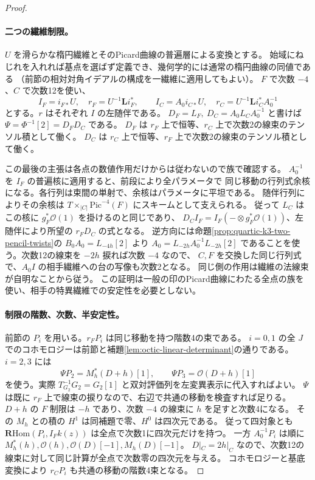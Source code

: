 \begin{proof}
\paragraph{二つの繊維制限。}
$U$ を滑らかな楕円繊維とそのPicard曲線の普遍層による変換とする。
始域にねじれを入れれば基点を選ばず定義でき、幾何学的には通常の楕円曲線の同値である
（前節の相対対角イデアルの構成を一繊維に適用してもよい）。
$F$ で次数 $-4$、$C$ で次数12を使い、
\[
 I_F=i_{F*}U,\quad r_F=U^{-1}\mathbf L i_F^*,\qquad
 I_C=A_0 i_{C*}U,\quad r_C=U^{-1}\mathbf L i_C^* A_0^{-1}
\]
とする。$r$ はそれぞれ $I$ の左随伴である。
$D_F=L_F,\ D_C=A_0 L_C A_0^{-1}$ と書けば $\Psi=\Phi^{-1}[2]=D_F D_C$ である。
$D_F$ は $r_F$ 上で恒等、$r_C$ 上で次数2の線束のテンソル積として働く。
$D_C$ は $r_C$ 上で恒等、$r_F$ 上で次数2の線束のテンソル積として働く。

この最後の主張は各点の数値作用だけからは従わないので族で確認する。
$A_0^{-1}$ を $I_F$ の普遍核に適用すると、前段により全パラメータで
同じ移動の行列式余核になる。各行列は束間の単射で、余核はパラメータに平坦である。
随伴行列によりその余核は $T\times_{|C|}\mathrm{Pic}^{-4}(F)$ にスキームとして支えられる。
従って $L_C$ はこの核に $g_F^*\mathcal O(1)$ を掛けるのと同じであり、
$D_C I_F=I_F(-\otimes g_F^*\mathcal O(1))$、左随伴により所望の $r_F D_C$ の式となる。
逆方向には命題\ref{prop:quartic-k3-two-pencil-twists}の $B_0A_0=L_{-4h}[2]$ より
$A_0=L_{-2h}A_0^{-1}L_{-2h}[2]$ であることを使う。次数12の線束を $-2h$ 捩れば次数 $-4$ なので、
$C,F$ を交換した同じ行列式で、$A_0 I$ の相手繊維への台の写像も次数2となる。
同じ側の作用は繊維の法線束が自明なことから従う。
この証明は一般の印のPicard曲線にわたる全点の族を使い、相手の特異繊維での安定性を必要としない。

\paragraph{制限の階数、次数、半安定性。}
前節の $P_i$ を用いる。$r_F P_i$ は同じ移動を持つ階数4の束である。
$i=0,1$ の全 $J$ でのコホモロジーは前節と補題\ref{lem:octic-linear-determinant}の通りである。
$i=2,3$ には
\[
 \Psi P_2=M_h^*(D+h)[1],\qquad \Psi P_3=\mathcal O(D+h)[1]
\]
を使う。実際 $T_{G_2}^{-1}G_2=G_2[1]$ と双対評価列を左変異表示に代入すればよい。
$\Psi$ は既に $r_F$ 上で線束の捩りなので、右辺で共通の移動を検査すれば足りる。
$D+h$ の $F$ 制限は $-h$ であり、次数 $-4$ の線束に $h$ を足すと次数4になる。
その $M_h$ との積の $H^1$ は同補題で零、$H^0$ は四次元である。
従って四対象とも $\mathbf R\mathrm{Hom}(P_i,I_F k(z))$ は全点で次数1に四次元だけを持つ。
一方 $A_0^{-1}P_i$ は順に
$M_h^*(h),\mathcal O(h),\mathcal O(D)[-1],M_h(D)[-1]$。
$D|_C=2h|_C$ なので、次数12の線束に対して同じ計算が全点で次数零の四次元を与える。
コホモロジーと基底変換により $r_C P_i$ も共通の移動の階数4束となる。


\end{proof}
